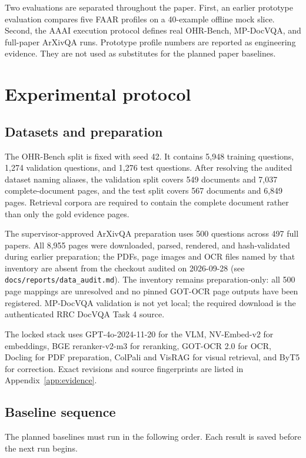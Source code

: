 \documentclass[10pt,twocolumn]{article}
\begin{document}
Two evaluations are separated throughout the paper. First, an earlier prototype evaluation compares five FAAR profiles on a 40-example offline mock slice. Second, the AAAI execution protocol defines real OHR-Bench, MP-DocVQA, and full-paper ArXivQA runs. Prototype profile numbers are reported as engineering evidence. They are not used as substitutes for the planned paper baselines.

\section{Experimental protocol}

\subsection{Datasets and preparation}

The OHR-Bench split is fixed with seed 42. It contains 5,948 training questions, 1,274 validation questions, and 1,276 test questions. After resolving the audited dataset naming aliases, the validation split covers 549 documents and 7,037 complete-document pages, and the test split covers 567 documents and 6,849 pages. Retrieval corpora are required to contain the complete document rather than only the gold evidence pages.

The supervisor-approved ArXivQA preparation uses 500 questions across 497 full papers. All 8,955 pages were downloaded, parsed, rendered, and hash-validated during earlier preparation; the PDFs, page images and OCR files named by that inventory are absent from the checkout audited on 2026-09-28 (see \texttt{docs/reports/data\_audit.md}). The inventory remains preparation-only: all 500 page mappings are unresolved and no pinned GOT-OCR page outputs have been registered. MP-DocVQA validation is not yet local; the required download is the authenticated RRC DocVQA Task 4 source.

The locked stack uses GPT-4o-2024-11-20 for the VLM, NV-Embed-v2 for embeddings, BGE reranker-v2-m3 for reranking, GOT-OCR 2.0 for OCR, Docling for PDF preparation, ColPali and VisRAG for visual retrieval, and ByT5 for correction. Exact revisions and source fingerprints are listed in Appendix~\ref{app:evidence}.

\subsection{Baseline sequence}

The planned baselines must run in the following order. Each result is saved before the next run begins.
\end{document}
